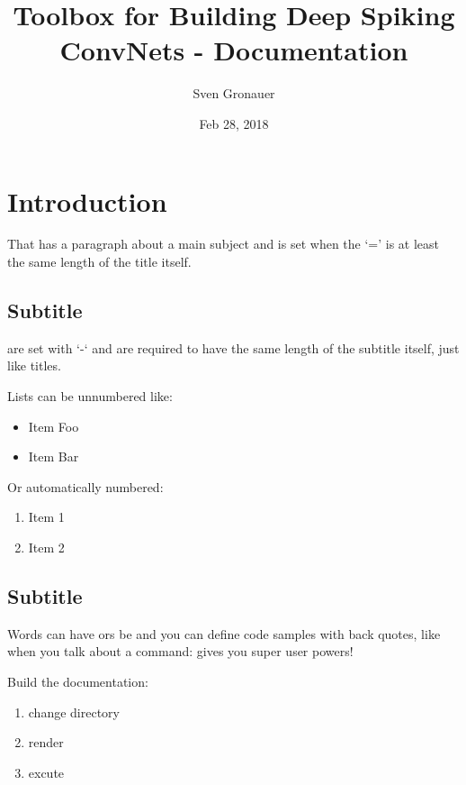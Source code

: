 \documentclass[letterpaper,10pt,english]{sphinxmanual}
\title{Toolbox for Building Deep Spiking ConvNets - Documentation}
\date{Feb 28, 2018}
\author{Sven Gronauer}
\begin{document}
\maketitle
\sphinxtableofcontents
{}\label{\detokenize{index::doc}}



\chapter{Introduction}
\label{\detokenize{introduction:introduction}}\label{\detokenize{introduction::doc}}\label{\detokenize{introduction:welcome-to-the-documentation}}
That has a paragraph about a main subject and is set when the ‘=’
is at least the same length of the title itself.


\section{Subtitle}
\label{\detokenize{introduction:subtitle}}
 are set with ‘-‘ and are required to have the same length
of the subtitle itself, just like titles.

Lists can be unnumbered like:
\begin{itemize}
\item {} 
Item Foo

\item {} 
Item Bar

\end{itemize}

Or automatically numbered:
\begin{enumerate}
\item {} 
Item 1

\item {} 
Item 2

\end{enumerate}


\section{Subtitle}
\label{\detokenize{introduction:id1}}
Words can have  ors be  and you can define
code samples with back quotes, like when you talk about a command: 
gives you super user powers!

Build the documentation:
\begin{enumerate}
\item {} 
change directory 

\item {} 
render 

\item {} 
excute 

\end{enumerate}
\end{document}
